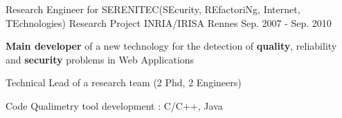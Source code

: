 \begin{cventries}
    \cventry
    {Research Engineer for SERENITEC(SEcurity, REfactoriNg, Internet, TEchnologies) Research Project} %
    {INRIA/IRISA} %
    {Rennes} %
    {Sep. 2007 - Sep. 2010} %
    {
        \begin{cvitems} %
            \item {\textbf{Main developer} of a new technology for the detection of \textbf{quality}, reliability and \textbf{security} problems in Web Applications}
            \item {Technical Lead of a research team (2 Phd, 2 Engineers)}
            \item {Code Qualimetry tool development : C/C++, Java}
        \end{cvitems}
    }


\end{cventries}
